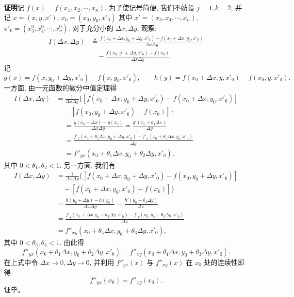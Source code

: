 \documentclass[UTF8, 12pt, fontset=fandol, oneside]{ctexart}
\begin{document}
\noindent\textbf{证明}\quad 记 $f(x)=f(x_1,x_2,\cdots,x_n)$. 为了使记号简便, 我们不妨设 $j=1,k=2$, 并记 $x=(x,y,x')$, $x_0=(x_0,y_0,x'_0)$ 其中 $x'=(x_3,x_4,\cdots,x_n)$, $x'_0=(x_3^0,x_4^0,\cdots,x_n^0)$. 对于充分小的 $\Delta x,\Delta y$, 观察:
\[
\begin{aligned}
  I(\Delta x,\Delta y)
  &\triangleq
  \frac{f(x_0+\Delta x,y_0+\Delta y,x'_0)-f(x_0+\Delta x,y_0,x'_0)}{\Delta x\Delta y}\\
  &\quad-\frac{f(x_0,y_0+\Delta y,x'_0)-f(x_0)}{\Delta x\Delta y}.
\end{aligned}
\]
记
\[
  g(x)=f(x,y_0+\Delta y,x'_0)-f(x,y_0,x'_0),
  \qquad
  h(y)=f(x_0+\Delta x,y,x'_0)-f(x_0,y,x'_0).
\]
一方面, 由一元函数的微分中值定理得
\[
\begin{aligned}
  I(\Delta x,\Delta y)
  &=\frac1{\Delta x\Delta y}
  \{[f(x_0+\Delta x,y_0+\Delta y,x'_0)-f(x_0+\Delta x,y_0,x'_0)]\\
  &\quad-[f(x_0,y_0+\Delta y,x'_0)-f(x_0)]\}
\end{aligned}
\]
\[
\begin{aligned}
  &=\frac{g(x_0+\Delta x)-g(x_0)}{\Delta x\Delta y}
  =\frac{g'(x_0+\theta_1\Delta x)}{\Delta y}\\
  &=\frac{f'_x(x_0+\theta_1\Delta x,y_0+\Delta y,x'_0)
  -f'_x(x_0+\theta_1\Delta x,y_0,x'_0)}{\Delta y}\\
  &=f''_{yx}(x_0+\theta_1\Delta x,y_0+\theta_2\Delta y,x'_0),
\end{aligned}
\]
其中 $0<\theta_1,\theta_2<1$. 另一方面, 我们有
\[
\begin{aligned}
  I(\Delta x,\Delta y)
  &=\frac1{\Delta x\Delta y}
  \{[f(x_0+\Delta x,y_0+\Delta y,x'_0)-f(x_0,y_0+\Delta y,x'_0)]\\
  &\quad-[f(x_0+\Delta x,y_0,x'_0)-f(x_0)]\}\\
  &=\frac{h(y_0+\Delta y)-h(y_0)}{\Delta x\Delta y}
  =\frac{h'(y_0+\theta_3\Delta y)}{\Delta x}\\
  &=\frac{f'_y(x_0+\Delta x,y_0+\theta_3\Delta y,x'_0)
  -f'_y(x_0,y_0+\theta_3\Delta y,x'_0)}{\Delta x}\\
  &=f''_{xy}(x_0+\theta_4\Delta x,y_0+\theta_3\Delta y,x'_0),
\end{aligned}
\]
其中 $0<\theta_3,\theta_4<1$. 由此得
\[
  f''_{yx}(x_0+\theta_1\Delta x,y_0+\theta_2\Delta y,x'_0)
  =f''_{xy}(x_0+\theta_4\Delta x,y_0+\theta_3\Delta y,x'_0).
\]
在上式中令 $\Delta x\to0,\Delta y\to0$, 并利用 $f''_{yx}(x)$ 与 $f''_{xy}(x)$ 在 $x_0$ 处的连续性即得
\[
  f''_{yx}(x_0)=f''_{xy}(x_0).
\]
证毕。
\end{document}

